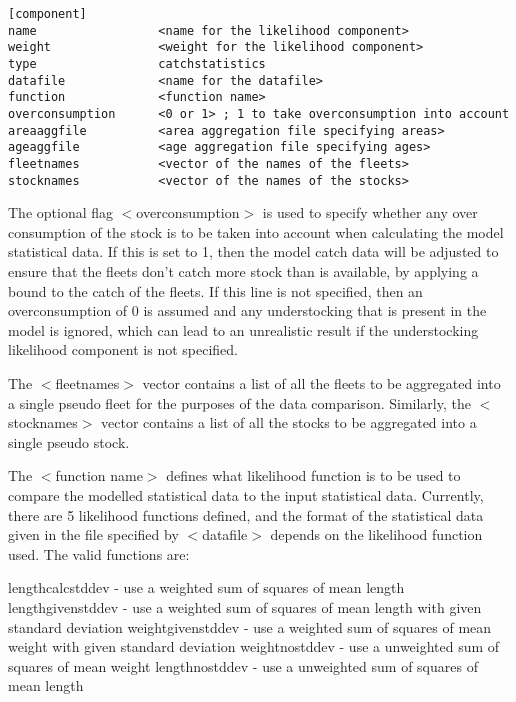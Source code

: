 \documentclass[10pt,twoside]{book}
\begin{document}
{\small\begin{verbatim}
[component]
name                 <name for the likelihood component>
weight               <weight for the likelihood component>
type                 catchstatistics
datafile             <name for the datafile>
function             <function name>
overconsumption      <0 or 1> ; 1 to take overconsumption into account
areaaggfile          <area aggregation file specifying areas>
ageaggfile           <age aggregation file specifying ages>
fleetnames           <vector of the names of the fleets>
stocknames           <vector of the names of the stocks>
\end{verbatim}}

The optional flag $<$overconsumption$>$ is used to specify whether any over consumption of the stock is to be taken into account when calculating the model statistical data.  If this is set to 1, then the model catch data will be adjusted to ensure that the fleets don't catch more stock than is available, by applying a bound to the catch of the fleets.  If this line is not specified, then an overconsumption of 0 is assumed and any understocking that is present in the model is ignored, which can lead to an unrealistic result if the understocking likelihood component is not specified.

\bigskip
The $<$fleetnames$>$ vector contains a list of all the fleets to be aggregated into a single pseudo fleet for the purposes of the data comparison.  Similarly, the $<$stocknames$>$ vector contains a list of all the stocks to be aggregated into a single pseudo stock.

\bigskip
The $<$function name$>$ defines what likelihood function is to be used to compare the modelled statistical data to the input statistical data.  Currently, there are 5 likelihood functions defined, and the format of the statistical data given in the file specified by $<$datafile$>$ depends on the likelihood function used.  The valid functions are:

\bigskip
lengthcalcstddev - use a weighted sum of squares of mean length\newline
lengthgivenstddev - use a weighted sum of squares of mean length with given standard deviation\newline
weightgivenstddev - use a weighted sum of squares of mean weight with given standard deviation\newline
weightnostddev - use a unweighted sum of squares of mean weight\newline
lengthnostddev - use a unweighted sum of squares of mean length
\end{document}
